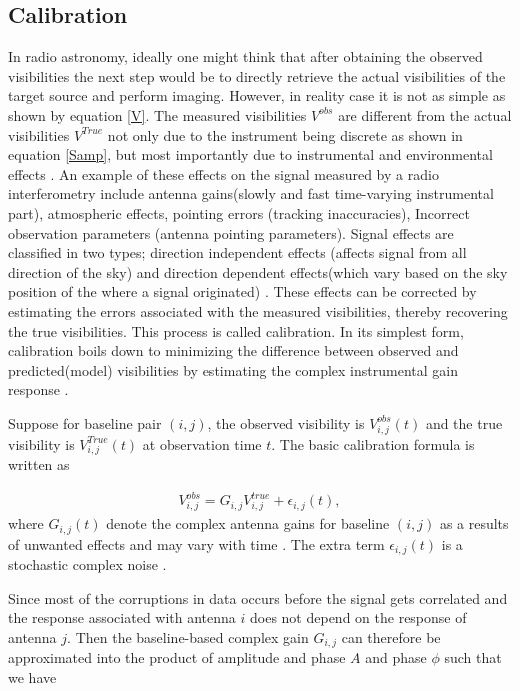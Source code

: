 \subsection{Calibration}
\label{Calib}
In radio astronomy, ideally one might think that after obtaining the observed visibilities the next step would be to directly retrieve the actual visibilities of the target source and perform imaging. However, in reality case it is not as simple as shown by equation \ref{V}. The measured visibilities $V^{obs}$ are different from the actual visibilities $V^{True}$ not only due to the instrument being discrete as shown in equation \ref{Samp}, but most importantly due to instrumental and environmental effects \citep{abebe2015study}. An example of these effects on the signal measured by a radio interferometry include antenna gains(slowly and fast time-varying instrumental part), atmospheric effects, pointing errors (tracking inaccuracies), Incorrect observation parameters (antenna pointing parameters). Signal effects are classified in two types; direction independent effects (affects signal from all direction of the sky) and direction dependent effects(which vary based on the sky position of the where a signal originated) \citep{taylor1999synthesis}. These effects can be corrected by estimating the errors associated with the measured visibilities, thereby recovering the true visibilities. This process is called calibration. In its simplest form, calibration boils down to minimizing the difference between observed and predicted(model) visibilities by estimating the complex instrumental gain response \citep{grobler2016calibration}. 

Suppose for baseline pair $(i,j)$, the observed visibility is $V^{obs}_{i,j}(t)$ and the true visibility is $V^{True}_{i,j}(t)$ at observation time $t$. The basic calibration formula is written as 

\begin{align}
V_{i,j}^{obs}=G_{i,j} V_{i,j}^{true} + \epsilon_{i,j}(t) ,
\end{align}
where $G_{i,j}(t)$ denote the complex antenna gains for baseline $(i,j)$ as a results of unwanted effects and may vary with time \citep{thompson2001interferometry}. The extra term $ \epsilon_{i,j}(t)$ is a stochastic complex noise \citep{taylor1999synthesis}.

Since most of the corruptions in data occurs before the signal gets correlated and the response associated with antenna  $i$  does not depend on the response of antenna $j$. Then the baseline-based complex gain $G_{i,j}$ can therefore be approximated into the product of amplitude and phase $A$ and phase $\phi$ such that we have  

